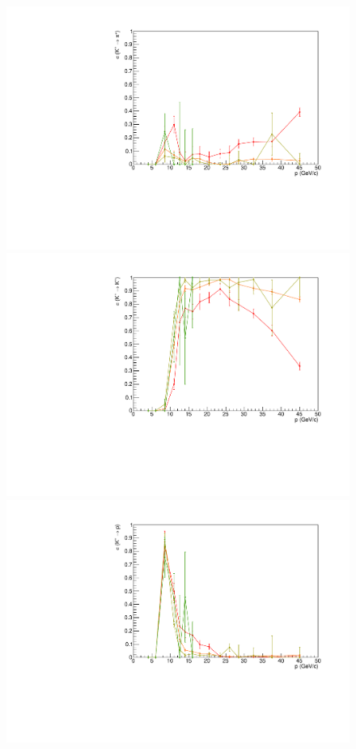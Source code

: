 \begin{figure}[!p]
  \centering
	\includegraphics[scale=0.38]{./gfx/Kp_pi.pdf}
  \includegraphics[scale=0.38]{./gfx/Kp_K.pdf}
  \includegraphics[scale=0.38]{./gfx/Kp_p.pdf}

\end{figure}
